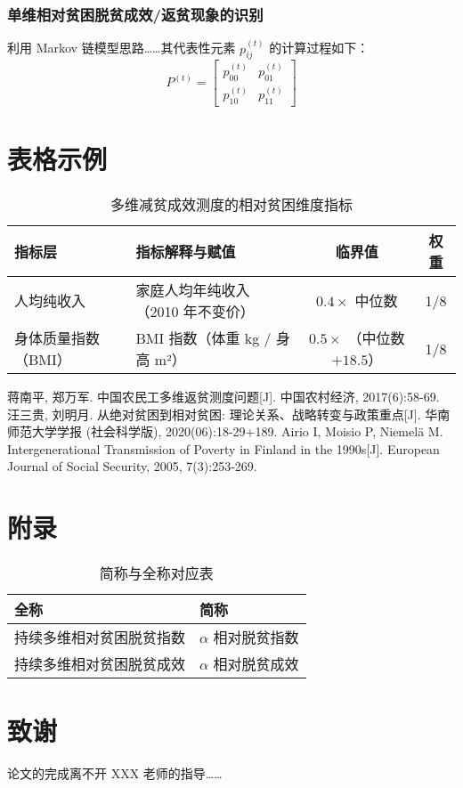 \documentclass[12pt,a4paper]{article}
\begin{document}
\subsubsection{单维相对贫困脱贫成效/返贫现象的识别}
利用 Markov 链模型思路……其代表性元素 $p_{ij}^{(t)}$ 的计算过程如下：
\begin{equation}
    P^{(t)} =
    \begin{bmatrix}
        p_{00}^{(t)} & p_{01}^{(t)} \\
        p_{10}^{(t)} & p_{11}^{(t)}
    \end{bmatrix}
\end{equation}

\newpage
\section{表格示例}
\begin{table}[htbp]
    \centering
    \caption{多维减贫成效测度的相对贫困维度指标}
    \begin{tabular}{llcc}
        \toprule
        指标层 & 指标解释与赋值 & 临界值 & 权重 \\
        \midrule
        人均纯收入 & 家庭人均年纯收入（2010 年不变价） & $0.4 \times$ 中位数 & 1/8 \\
        身体质量指数（BMI） & BMI 指数（体重 kg / 身高 m²） & $0.5 \times$ （中位数 $+18.5$） & 1/8 \\
        \bottomrule
    \end{tabular}
\end{table}

\newpage
\begin{thebibliography}{99}
 蒋南平, 郑万军. 中国农民工多维返贫测度问题[J]. 中国农村经济, 2017(6):58-69.
 汪三贵, 刘明月. 从绝对贫困到相对贫困: 理论关系、战略转变与政策重点[J]. 华南师范大学学报 (社会科学版), 2020(06):18-29+189.
 Airio I, Moisio P, Niemelä M. Intergenerational Transmission of Poverty in Finland in the 1990s[J]. European Journal of Social Security, 2005, 7(3):253-269.
\end{thebibliography}

\newpage
\section*{附录}
\begin{table}[htbp]
    \centering
    \caption{简称与全称对应表}
    \begin{tabular}{ll}
        \toprule
        全称 & 简称 \\
        \midrule
        持续多维相对贫困脱贫指数 & $\alpha$ 相对脱贫指数 \\
        持续多维相对贫困脱贫成效 & $\alpha$ 相对脱贫成效 \\
        \bottomrule
    \end{tabular}
\end{table}

\section*{致谢}
论文的完成离不开 XXX 老师的指导……
\end{document}
